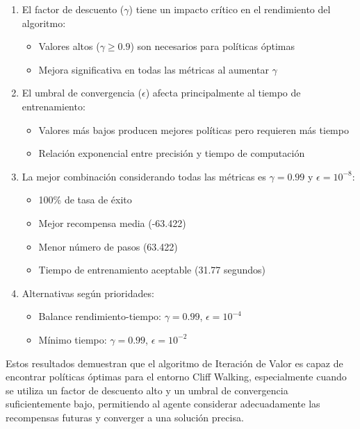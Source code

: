 \begin{enumerate}
    \item El factor de descuento ($\gamma$) tiene un impacto crítico en el rendimiento del algoritmo:
    \begin{itemize}
        \item Valores altos ($\gamma \geq 0.9$) son necesarios para políticas óptimas
        \item Mejora significativa en todas las métricas al aumentar $\gamma$
    \end{itemize}

    \item El umbral de convergencia ($\epsilon$) afecta principalmente al tiempo de entrenamiento:
    \begin{itemize}
        \item Valores más bajos producen mejores políticas pero requieren más tiempo
        \item Relación exponencial entre precisión y tiempo de computación
    \end{itemize}

    \item La mejor combinación considerando todas las métricas es $\gamma = 0.99$ y $\epsilon = 10^{-8}$:
    \begin{itemize}
        \item 100\% de tasa de éxito
        \item Mejor recompensa media (-63.422)
        \item Menor número de pasos (63.422)
        \item Tiempo de entrenamiento aceptable (31.77 segundos)
    \end{itemize}

    \item Alternativas según prioridades:
    \begin{itemize}
        \item Balance rendimiento-tiempo: $\gamma = 0.99$, $\epsilon = 10^{-4}$
        \item Mínimo tiempo: $\gamma = 0.99$, $\epsilon = 10^{-2}$
    \end{itemize}
\end{enumerate}

Estos resultados demuestran que el algoritmo de Iteración de Valor es capaz de encontrar políticas óptimas para el entorno Cliff Walking, especialmente cuando se utiliza un factor de descuento alto y un umbral de convergencia suficientemente bajo, permitiendo al agente considerar adecuadamente las recompensas futuras y converger a una solución precisa.

\newpage
